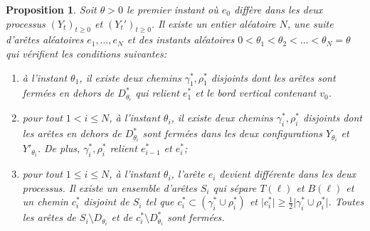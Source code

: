 \documentclass[titlepage,a4paper,12pt]{article}
\newcounter{prop}
\newtheorem{chaine}[prop]{Proposition}
\begin{document}
\begin{chaine}
\label{chaine}
Soit $\theta>0$ le premier instant où $e_0$ diffère dans les deux processus $(Y_t)_{t\geqslant 0}$ et $(Y_t')_{t\geqslant 0}$. Il existe un entier aléatoire $N$, une suite d'arêtes aléatoires $e_1,\dots,e_N$ et des instants aléatoires $0<\theta_1< \theta_2<\dots<\theta_N=\theta$ qui vérifient les conditions suivantes:

\begin{enumerate}[leftmargin =*]
\item à l'instant $\theta_1$, il existe deux chemins $\gamma_1^*,\rho_1^*$ disjoints dont les arêtes sont fermées en dehors de $D_{\theta_i}^*$ qui relient $e_1^*$ et le bord vertical contenant $v_0$.

\item pour tout $1<i\leqslant N$, à l'instant $\theta_i$, il existe deux chemins $\gamma_i^*,\rho_i^*$ disjoints dont les arêtes en dehors de $D_{\theta_i}^*$ sont fermées dans les deux configurations $Y_{\theta_i}$ et $Y'_{\theta_i}$. De plus, $\gamma_i^*,\rho_i^*$ relient $e_{i-1}^*$ et $e_i^*$;

\item pour tout $1\leqslant i \leqslant N$, à l'instant $\theta_i$, l'arête $e_i$ devient différente dans les deux processus. Il existe un ensemble d'arêtes $S_i$ qui sépare $T(\ell)$ et $B(\ell)$ et un chemin $c^*_i$ disjoint de $S_i$ tel que $c_i^* \subset (\gamma_i^*\cup \rho_i^*)$ et $\vert c_i^*\vert \geqslant \frac{1}{2} \vert \gamma_i^*\cup \rho_i^* \vert$. Toutes les arêtes de $S_i\setminus D_{\theta_i}$ et de  $c^*_i\setminus D_{\theta_i}^*$ sont fermées.
\end{enumerate}

\end{chaine}
\end{document}

